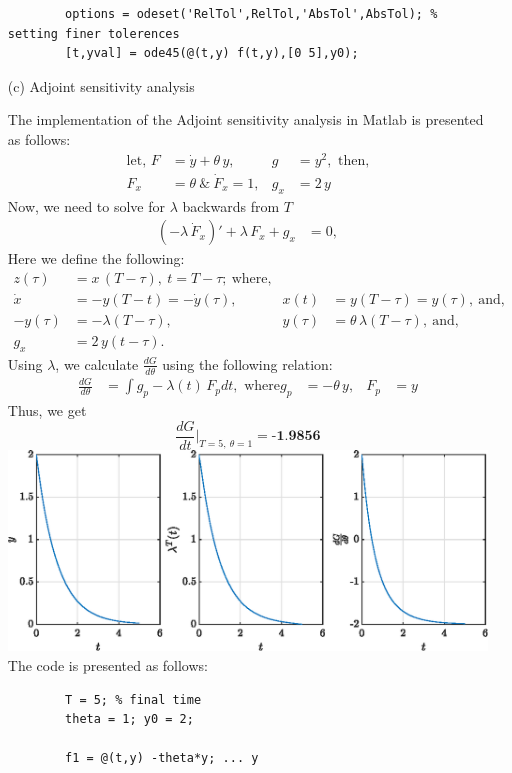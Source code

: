 \begin{enumerate}
\begin{lstlisting}
		options = odeset('RelTol',RelTol,'AbsTol',AbsTol); % setting finer tolerences
		[t,yval] = ode45(@(t,y) f(t,y),[0 5],y0);
	\end{lstlisting}
	\item[(c)] Adjoint sensitivity analysis
	
	The implementation of the Adjoint sensitivity analysis in Matlab is presented as follows:
	\begin{align*}
		\text{let, }F &= \dot y + \theta\,y,\ & g&= y^2, \text{ then,}\\
		F_x &= \theta\ \&\ \dot F_x = 1, & g_x &= 2\,y		
	\end{align*}
	Now, we need to solve for $\lambda$ backwards from $T$
	\begin{align*}
		(-\lambda\,\dot F_x)' + \lambda\,F_x + g_x &= 0,
	\end{align*}
	Here we define the following:
	\begin{align*}
		z(\tau) &= x\,(T - \tau),\ t = T - \tau;\ \text{where,}\\
		\dot x &= -y(T -t) = -\dot y(\tau), & x(t) &= y(T-\tau) = y(\tau),\ \text{and,}\\
		-y(\tau) &= -\lambda(T-\tau), & y(\tau) &= \theta\,\lambda(T-\tau),\ \text{and,}\\
		g_x &= 2\,y(t-\tau).
	\end{align*}
	Using $\lambda$, we calculate $\frac{dG}{d\theta}$ using the following relation:
	\begin{align*}
		\frac{dG}{d\theta} &= \int g_p - \lambda(t)\,F_p dt,\text{ where}
		g_p &= -\theta\,y, & F_p &= y
	\end{align*}
	Thus, we get $$\frac{dG}{dt}\Bigg|_{T = 5,\ \theta = 1} = \textbf{-1.9856}$$
	\includegraphics[width=\textwidth]{Figures/Ugf31c.eps}
	The code is presented as follows:
	\begin{lstlisting}
		T = 5; % final time 
		theta = 1; y0 = 2;
		
		f1 = @(t,y) -theta*y; ... y
		

\end{lstlisting}
\end{enumerate}
